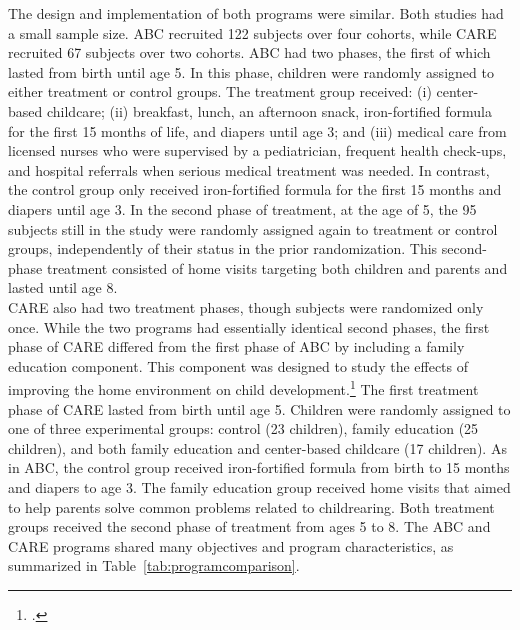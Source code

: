 \noindent The design and implementation of both programs were similar. Both studies had a small sample size. ABC recruited 122 subjects over four cohorts, while CARE recruited 67 subjects over two cohorts. ABC had two phases, the first of which lasted from birth until age 5. In this phase, children were randomly assigned to either treatment or control groups. The treatment group received: (i) center-based childcare; (ii) breakfast, lunch, an afternoon snack, iron-fortified formula for the first 15 months of life, and diapers until age 3; and (iii) medical care from licensed nurses who were supervised by a pediatrician, frequent health check-ups, and hospital referrals when serious medical treatment was needed. In contrast, the control group only received iron-fortified formula for the first 15 months and diapers until age 3. In the second phase of treatment, at the age of 5, the 95 subjects still in the study were randomly assigned again to treatment or control groups, independently of their status in the prior randomization. This second-phase treatment consisted of home visits targeting both children and parents and lasted until age 8.\\ 

\noindent  CARE also had two treatment phases, though subjects were randomized only once. While the two programs had essentially identical second phases, the first phase of CARE differed from the first phase of ABC by including a family education component. This component was designed to study the effects of improving the home environment on child development.\footnote{\citet{Wasik_Ramey_etal_1990_CD}.} The first treatment phase of CARE lasted from birth until age 5. Children were randomly assigned to one of three experimental groups: control (23 children), family education (25 children), and both family education and center-based childcare (17 children). As in ABC, the control group received iron-fortified formula from birth to 15 months and diapers to age 3. The family education group received home visits that aimed to help parents solve common problems related to childrearing. Both treatment groups received the second phase of treatment from ages 5 to 8. The ABC and CARE programs shared many objectives and program characteristics, as summarized in Table~\ref{tab:programcomparison}.\\



